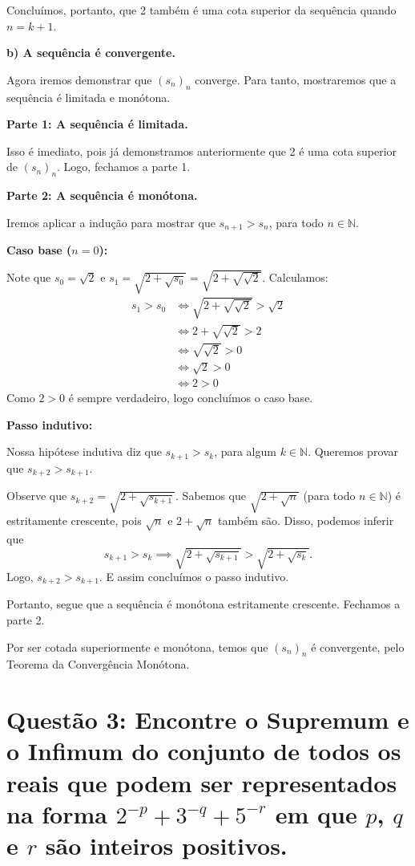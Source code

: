 \documentclass[12pt]{article}
\begin{document}
	Concluímos, portanto, que 2 também é uma cota superior da sequência quando $n = k + 1$. \blacksquare
	
	\textbf{b) A sequência é convergente.}
	
	Agora iremos demonstrar que $(s_n)_n$ converge. Para tanto, mostraremos que a sequência é limitada e monótona.
	
	\textbf{Parte 1: A sequência é limitada.}
	
	Isso é imediato, pois já demonstramos anteriormente que 2 é uma cota superior de $(s_n)_n$. Logo, fechamos a parte 1.
	
	\textbf{Parte 2: A sequência é monótona.}
	
	Iremos aplicar a indução para mostrar que $s_{n + 1} > s_n$, para todo $n \in \mathbb{N}$.
	
	\textbf{Caso base ($n = 0$):}
	
	Note que $s_0 = \sqrt{2}$ e $s_1 = \sqrt{2 + \sqrt{s_0}} = \sqrt{2 + \sqrt{\sqrt{2}}}$. Calculamos:
	\begin{align*}
		s_1 > s_0
		&\iff \sqrt{2 + \sqrt{\sqrt{2}}} > \sqrt{2} \\
		&\iff 2 + \sqrt{\sqrt{2}} > 2 \\
		&\iff \sqrt{\sqrt{2}} > 0 \\
		&\iff \sqrt{2} > 0 \\
		&\iff 2 > 0
	\end{align*}
	Como $2 > 0$ é sempre verdadeiro, logo concluímos o caso base.
	
	\textbf{Passo indutivo:}
	
	Nossa hipótese indutiva diz que $s_{k + 1} > s_k$, para algum $k \in \mathbb{N}$. Queremos provar que $s_{k + 2} > s_{k + 1}$.
	
	Observe que $s_{k + 2} = \sqrt{2 + \sqrt{s_{k + 1}}}$. Sabemos que $\sqrt{2 + \sqrt{n}}$ (para todo $n \in \mathbb{N}$) é estritamente crescente, pois $\sqrt{n}$ e $2 + \sqrt{n}$ também são. Disso, podemos inferir que
	\[
	s_{k + 1} > s_k \implies \sqrt{2 + \sqrt{s_{k + 1}}} > \sqrt{2 + \sqrt{s_k}}.
	\]
	Logo, $s_{k + 2} > s_{k + 1}$. E assim concluímos o passo indutivo.
	
	Portanto, segue que a sequência é monótona estritamente crescente. Fechamos a parte 2.
	
	Por ser cotada superiormente e monótona, temos que $(s_n)_n$ é convergente, pelo Teorema da Convergência Monótona. \blacksquare
	
	\section*{Questão 3: Encontre o Supremum e o Infimum do conjunto de todos os reais que podem ser representados na forma $2^{-p} + 3^{-q} + 5^{-r}$ em que $p$, $q$ e $r$ são inteiros positivos.}
	
\end{document}
